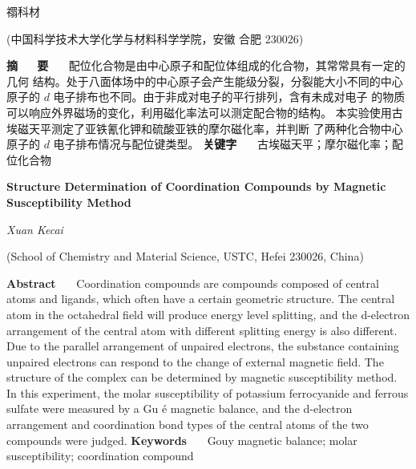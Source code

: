 \documentclass[12pt]{ctexart}
\numberwithin{equation}{section}
\begin{document}
\nocite{*}

\begin{center}
    \heiti {}

    \vspace{12pt}

    \kaishu \fontsize{13.75pt}{0}禤科材


    \vspace{5pt}

    \songti \fontsize{12pt}{0}(中国科学技术大学化学与材料科学学院，安徽 合肥 230026)
\end{center}

\noindent\textbf{摘~~~\!要}~~~\!
配位化合物是由中心原子和配位体组成的化合物，其常常具有一定的几何
结构。处于八面体场中的中心原子会产生能级分裂，分裂能大小不同的中心
原子的 $d$ 电子排布也不同。由于非成对电子的平行排列，含有未成对电子
的物质可以响应外界磁场的变化，利用磁化率法可以测定配合物的结构。
本实验使用古埃磁天平测定了亚铁氰化钾和硫酸亚铁的摩尔磁化率，并判断
了两种化合物中心原子的 $d$ 电子排布情况与配位键类型。
\newline
\textbf{关键字}~~~\!
古埃磁天平；摩尔磁化率；配位化合物

\begin{center}
    {\LARGE\rmfamily\textbf{Structure Determination of Coordination Compounds by Magnetic Susceptibility Method}}

    \vspace{12pt}

    {\slshape Xuan Kecai}

    \vspace{5pt}

    (School of Chemistry and Material Science, USTC, Hefei 230026, China)
\end{center}

\noindent\textbf{Abstract}~~~\!
Coordination compounds are compounds composed of central
atoms and ligands, which often have a certain geometric
structure. The central atom in the octahedral field will
produce energy level splitting, and the d-electron
arrangement of the central atom with different splitting
energy is also different. Due to the parallel arrangement of
unpaired electrons, the substance containing unpaired
electrons can respond to the change of external magnetic
field. The structure of the complex can be determined by
magnetic susceptibility method. In this experiment, the
molar susceptibility of potassium ferrocyanide and ferrous
sulfate were measured by a Gu é magnetic balance, and the
d-electron arrangement and coordination bond types of the
central atoms of the two compounds were judged.
\newline
\textbf{Keywords}~~~\!
Gouy magnetic balance; molar susceptibility; coordination
compound
\end{document}

